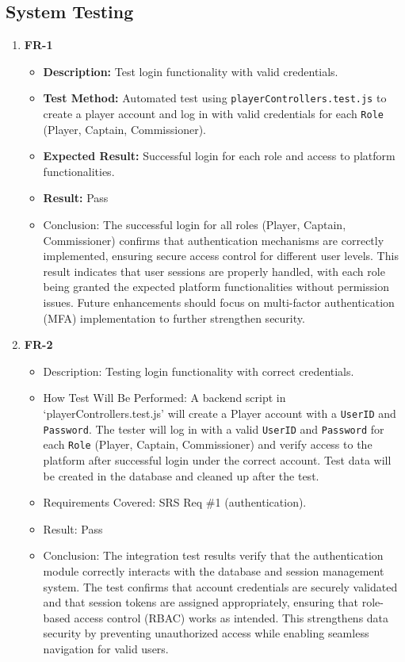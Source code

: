 \documentclass[12pt, titlepage]{article}
\begin{document}
\subsection{System Testing}
\begin{enumerate}
    \item \textbf{FR-1}
    \begin{itemize}
        \item \textbf{Description:} Test login functionality with valid credentials.
        \item \textbf{Test Method:} Automated test using \texttt{playerControllers.test.js} to create a player account and log in with valid credentials for each \texttt{Role} (Player, Captain, Commissioner).
        \item \textbf{Expected Result:} Successful login for each role and access to platform functionalities.
        \item \textbf{Result:} Pass
        \item Conclusion: The successful login for all roles (Player, Captain, Commissioner) confirms that authentication mechanisms are correctly implemented,
		ensuring secure access control for different user levels. This result indicates that user sessions are properly handled,
		with each role being granted the expected platform functionalities without permission issues.
		Future enhancements should focus on multi-factor authentication (MFA) implementation to further strengthen security.
    \end{itemize}

    \item \textbf{FR-2}
        \begin{itemize}
            \item Description: Testing login functionality with correct credentials.
            \item How Test Will Be Performed: A backend script in `playerControllers.test.js' will create a Player account with a \texttt{UserID} and \texttt{Password}. The tester will log in with a valid \texttt{UserID} and \texttt{Password} for each \texttt{Role} (Player, Captain, Commissioner) and verify access to the platform after successful login under the correct account. Test data will be created in the database and cleaned up after the test.
            \item Requirements Covered: SRS Req \#1 (authentication).
            \item Result: Pass
            \item Conclusion: The integration test results verify that the authentication module correctly interacts with the database and session management system.
			The test confirms that account credentials are securely validated and that session tokens are assigned appropriately, ensuring that role-based access control (RBAC) works as intended.
			This strengthens data security by preventing unauthorized access while enabling seamless navigation for valid users.
        \end{itemize}


\end{enumerate}
\end{document}
